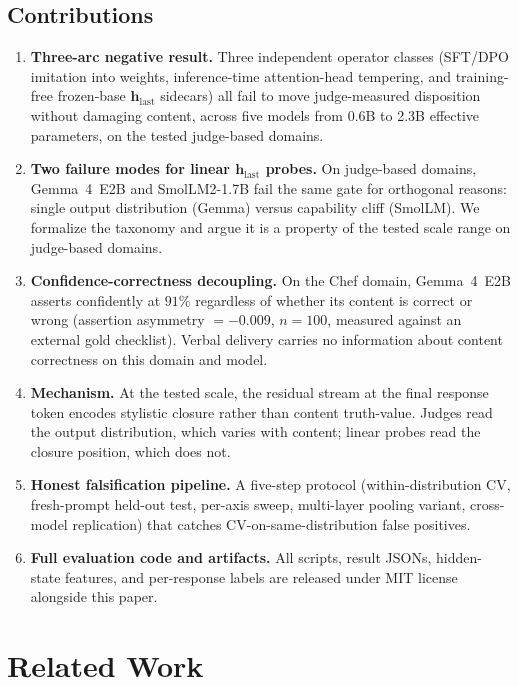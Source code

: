 \documentclass[11pt,a4paper]{article}
\begin{document}
\subsection{Contributions}

\begin{enumerate}[leftmargin=*]
    \item \textbf{Three-arc negative result.} Three independent operator classes (SFT/DPO imitation into weights, inference-time attention-head tempering, and training-free frozen-base $\mathbf{h}_{\text{last}}$ sidecars) all fail to move judge-measured disposition without damaging content, across five models from 0.6B to 2.3B effective parameters, on the tested judge-based domains.
    \item \textbf{Two failure modes for linear $\mathbf{h}_{\text{last}}$ probes.} On judge-based domains, Gemma~4~E2B and SmolLM2-1.7B fail the same gate for orthogonal reasons: single output distribution (Gemma) versus capability cliff (SmolLM). We formalize the taxonomy and argue it is a property of the tested scale range on judge-based domains.
    \item \textbf{Confidence-correctness decoupling.} On the Chef domain, Gemma~4~E2B asserts confidently at $91\%$ regardless of whether its content is correct or wrong (assertion asymmetry $= -0.009$, $n{=}100$, measured against an external gold checklist). Verbal delivery carries no information about content correctness on this domain and model.
    \item \textbf{Mechanism.} At the tested scale, the residual stream at the final response token encodes stylistic closure rather than content truth-value. Judges read the output distribution, which varies with content; linear probes read the closure position, which does not.
    \item \textbf{Honest falsification pipeline.} A five-step protocol (within-distribution CV, fresh-prompt held-out test, per-axis sweep, multi-layer pooling variant, cross-model replication) that catches CV-on-same-distribution false positives.
    \item \textbf{Full evaluation code and artifacts.} All scripts, result JSONs, hidden-state features, and per-response labels are released under MIT license alongside this paper.
\end{enumerate}

\section{Related Work}
\end{document}
